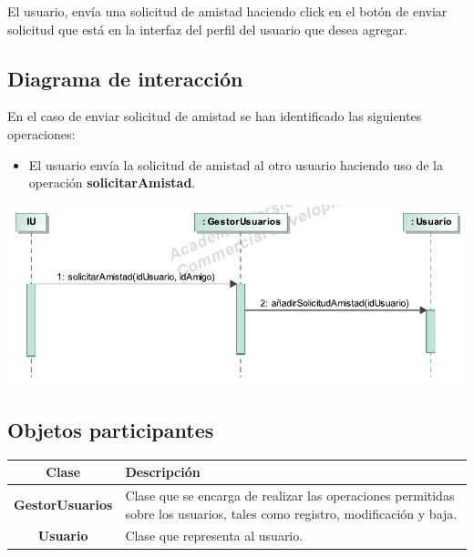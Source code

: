 \documentclass[12pt, a4paper, titlepage]{article}
\begin{document}
El usuario, envía una solicitud de amistad haciendo click en el botón de enviar solicitud que está en la interfaz del perfil del usuario que desea agregar.

\subsection{Diagrama de interacción}
En el caso de {\sc enviar solicitud de amistad } se han identificado las siguientes operaciones:

\begin{itemize}
	\item El usuario envía la solicitud de amistad al otro usuario haciendo uso de la operación \textbf{solicitarAmistad}.
\end{itemize}

\begin{center}
	\includegraphics{Imagenes/OperacionSolicitarAmistad}
\end{center}
\subsection{Objetos participantes}

\begin{center}

\begin{tabular}{|c|p{12cm}|}
	\hline
	\textbf{Clase} & \textbf{Descripción}\\ \hline
	\textbf{GestorUsuarios} &  Clase que se encarga de realizar las operaciones permitidas sobre los usuarios, tales como registro, modificación y baja.\\ \hline
	\textbf{Usuario} & Clase que representa al usuario. \\ \hline
\end{tabular}

\end{center}
\end{document}
